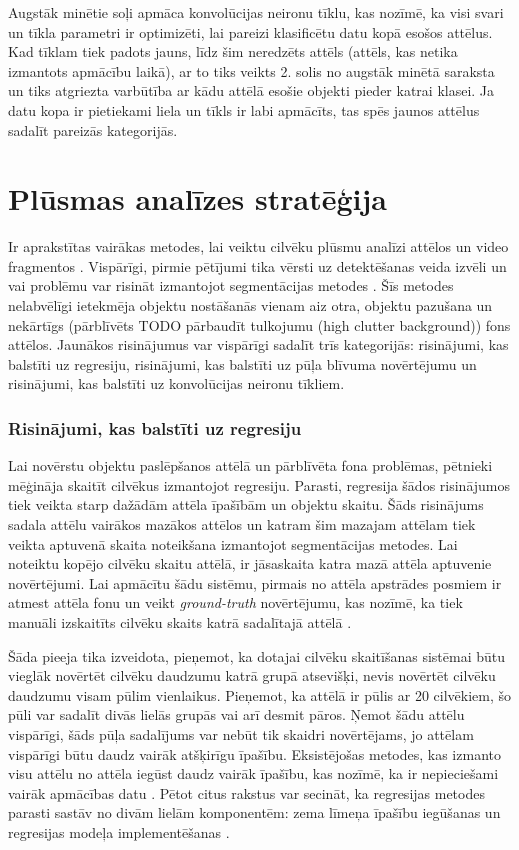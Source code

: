 Augstāk minētie soļi apmāca konvolūcijas neironu tīklu, kas nozīmē, ka visi svari un tīkla parametri ir optimizēti, lai pareizi klasificētu datu kopā esošos attēlus. Kad tīklam tiek padots jauns, līdz šim neredzēts attēls (attēls, kas netika izmantots apmācību laikā), ar to tiks veikts 2. solis no augstāk minētā saraksta un tiks atgriezta varbūtība ar kādu attēlā esošie objekti pieder katrai klasei. Ja datu kopa ir pietiekami liela un tīkls ir labi apmācīts, tas spēs jaunos attēlus sadalīt pareizās kategorijās. 

\section{Plūsmas analīzes stratēģija}
Ir aprakstītas vairākas metodes, lai veiktu cilvēku plūsmu analīzi attēlos un video fragmentos \cite{brostow2006unsupervised,chen2013cumulative,ge2009marked,chen2015person,lempitsky2010learning}. Vispārīgi, pirmie pētījumi tika vērsti uz detektēšanas veida izvēli un vai problēmu var risināt izmantojot segmentācijas metodes \cite{tu2008unified}. Šīs metodes nelabvēlīgi ietekmēja objektu nostāšanās vienam aiz otra, objektu pazušana un nekārtīgs (pārblīvēts TODO pārbaudīt tulkojumu (high clutter background)) fons attēlos. Jaunākos risinājumus var vispārīgi sadalīt trīs kategorijās: risinājumi, kas balstīti uz regresiju, risinājumi, kas balstīti uz pūļa blīvuma novērtējumu un risinājumi, kas balstīti uz konvolūcijas neironu tīkliem. 

\subsubsection{Risinājumi, kas balstīti uz regresiju}
Lai novērstu objektu paslēpšanos attēlā un pārblīvēta fona problēmas, pētnieki mēģināja skaitīt cilvēkus izmantojot regresiju. Parasti, regresija šādos risinājumos tiek veikta starp dažādām attēla īpašībām un objektu skaitu. Šāds risinājums sadala attēlu vairākos mazākos attēlos un katram šim mazajam attēlam tiek veikta aptuvenā skaita noteikšana izmantojot segmentācijas metodes. Lai noteiktu kopējo cilvēku skaitu attēlā, ir jāsaskaita katra mazā attēla aptuvenie novērtējumi. Lai apmācītu šādu sistēmu, pirmais no attēla apstrādes posmiem ir atmest attēla fonu un veikt \textit{ground-truth} novērtējumu, kas nozīmē, ka tiek manuāli izskaitīts cilvēku skaits katrā sadalītajā attēlā  \cite{chan2009bayesian,ryan2009crowd,chen2012feature}.

Šāda pieeja tika izveidota, pieņemot, ka dotajai cilvēku skaitīšanas sistēmai būtu vieglāk novērtēt cilvēku daudzumu katrā grupā atsevišķi, nevis novērtēt cilvēku daudzumu visam pūlim vienlaikus. Pieņemot, ka attēlā ir pūlis ar 20 cilvēkiem, šo pūli var sadalīt divās lielās grupās vai arī desmit pāros. Ņemot šādu attēlu vispārīgi, šāds pūļa sadalījums var nebūt tik skaidri novērtējams, jo attēlam vispārīgi būtu daudz vairāk atšķirīgu īpašību. Eksistējošas metodes, kas izmanto visu attēlu no attēla iegūst daudz vairāk īpašību, kas nozīmē, ka ir nepieciešami vairāk apmācības datu \cite{chan2008privacy}. Pētot citus rakstus var secināt, ka regresijas metodes parasti sastāv no divām lielām komponentēm: zema līmeņa īpašību iegūšanas un regresijas modeļa implementēšanas \cite{xiong2017spatiotemporal}. 

